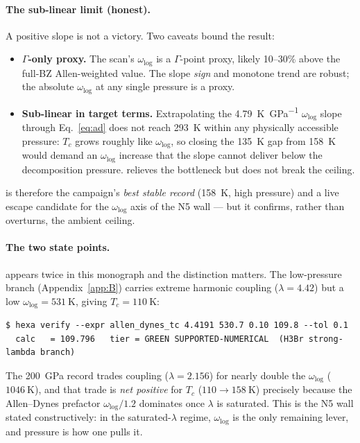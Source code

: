 \paragraph{The sub-linear limit (honest).}
A positive slope is not a victory. Two caveats bound the result:
\begin{itemize}\itemsep0.2em
\item \textbf{$\Gamma$-only proxy.} The scan's $\omega_{\log}$ is a
  $\Gamma$-point proxy, likely 10--30\% above the full-BZ
  Allen-weighted value. The slope \emph{sign} and monotone trend are robust;
  the absolute $\omega_{\log}$ at any single pressure is a proxy.
\item \textbf{Sub-linear in target terms.} Extrapolating the
  \SI{4.79}{\kelvin\per\giga\pascal} $\omega_{\log}$ slope through
  Eq.~\eqref{eq:ad} does not reach \SI{293}{\kelvin} within any physically
  accessible pressure: $T_c$ grows roughly like $\omega_{\log}$, so closing
  the \SI{135}{\kelvin} gap from \SI{158}{\kelvin} would demand an
  $\omega_{\log}$ increase that the slope cannot deliver below the
  decomposition pressure.  relieves the bottleneck but does not
  break the ceiling.
\end{itemize}

\noindent {} is therefore the campaign's \emph{best stable record}
(\SI{158}{\kelvin}, high pressure) and a live escape candidate for the
$\omega_{\log}$ axis of the N5 wall --- but it confirms, rather than
overturns, the ambient ceiling.

\paragraph{The two  state points.}
 appears twice in this monograph and the distinction matters. The
low-pressure branch (Appendix~\ref{app:B}) carries extreme harmonic coupling
($\lambda=4.42$) but a low $\omega_{\log}=\SI{531}{\kelvin}$, giving
$T_c=\SI{110}{\kelvin}$:
\begin{lstlisting}[basicstyle=\ttfamily\footnotesize,frame=single,xleftmargin=0pt]
$ hexa verify --expr allen_dynes_tc 4.4191 530.7 0.10 109.8 --tol 0.1
  calc   = 109.796   tier = GREEN SUPPORTED-NUMERICAL  (H3Br strong-lambda branch)
\end{lstlisting}
The \SI{200}{\giga\pascal} record trades coupling ($\lambda=2.156$) for
nearly double the $\omega_{\log}$ ($\SI{1046}{\kelvin}$), and that trade is
\emph{net positive} for $T_c$ ($110\to\SI{158}{\kelvin}$) precisely because
the Allen--Dynes prefactor $\omega_{\log}/1.2$ dominates once $\lambda$ is
saturated. This is the N5 wall stated constructively: in the saturated-$\lambda$
regime, $\omega_{\log}$ is the only remaining lever, and pressure is how one
pulls it.

